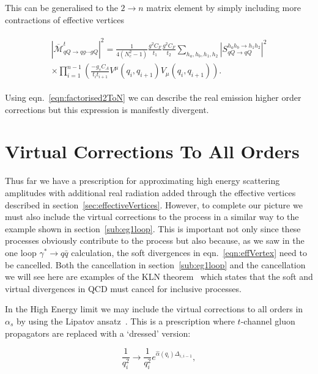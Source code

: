 	This can be generalised to the $2\rightarrow n$ matrix element by simply including more
	contractions of effective vertices

	\begin{align}
	\begin{split}
		|\overline{\mathcal{M}}^t_{qQ\rightarrow qg\cdots gQ}|^2 = \frac{1}{4(N_c^2-1)}
		\frac{g^2C_F}{t_1}\frac{g^2C_F}{t_2} \sum_{h_a, h_b, h_1, h_2}
		|S_{qQ\rightarrow qQ}^{h_ah_b\rightarrow h_1h_2}|^2\\
		\times\prod_{i=1}^{n-1}\left(\frac{-g_sC_A}{t_it_{i+1}}V^\mu(q_i, q_{i+1})V_\mu(q_i, q_{i+1})\right).
		\label{eqn:factorised2ToN}
	\end{split}
	\end{align}

	Using eqn.~\eqref{eqn:factorised2ToN} we can describe the real emission higher order
	corrections but this expression is manifestly divergent.

\section{Virtual Corrections To All Orders}
	\label{sub:virtuals}

	Thus far we have a prescription for approximating high energy scattering amplitudes with additional
	real radiation added through the effective vertices described in section~\eqref{sec:effectiveVertices}.
	However, to complete our picture we must also include the virtual corrections to the process in
	a similar way to the example shown in section~\eqref{sub:eg1loop}.  This is important
	not only since these processes obviously contribute to the process but also because, as we saw in
	the one loop $\gamma^*\to q\bar{q}$ calculation, the soft divergences in eqn.~\eqref{eqn:effVertex}
	need to be cancelled.  Both the cancellation in section~\eqref{sub:eg1loop} and the cancellation
	we will see here are examples of the KLN theorem~\cite{mutaBook} which states that the soft and virtual
	divergences in QCD must cancel for inclusive processes.

	In the High Energy limit we may include the virtual corrections to all orders in $\alpha_s$ by using
	the Lipatov ansatz~\cite{Kuraev:1976ge}.  This is a prescription where $t$-channel gluon propagators
	are replaced with a `dressed' version:

	\begin{equation}
		\frac{1}{q_i^2}\rightarrow\frac{1}{q_i^2}e^{\hat{\alpha}(q_i)\Delta_{i,i-1}},
		\label{eqn:lipAns}
	\end{equation}

